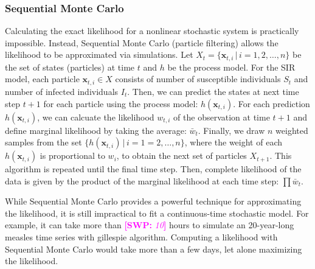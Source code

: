 \documentclass{article}
\newcommand{\comment}[3]{\textcolor{#1}{\textbf{[#2: }\textsl{#3}\textbf{]}}}
\newcommand{\swp}[1]{\comment{magenta}{SWP}{#1}}
\begin{document}
\subsubsection*{Sequential Monte Carlo}

Calculating the exact likelihood for a nonlinear stochastic system is practically impossible.
Instead, Sequential Monte Carlo (particle filtering) allows the likelihood to be approximated via simulations.
Let $X_t = \{\mathbf{x}_{t, i} \,|\, i= 1, 2, \dots, n\}$ be the set of states (particles) at time $t$ and $h$ be the process model.
For the SIR model, each particle $\mathbf{x}_{t, i} \in X$ consists of number of susceptible individuals $S_t$ and number of infected individuals $I_t$.
Then, we can predict the states at next time step $t+1$ for each particle using the process model: $h(\mathbf{x}_{t, i})$.
For each prediction $h(\mathbf{x}_{t, i})$, we can calcuate the likelihood $w_{t,i}$ of the observation at time $t+1$ and define marginal likelihood by taking the average: $\bar{w}_t$.
Finally, we draw $n$ weighted samples from the set $\{h(\mathbf{x}_{t, i}) \,|\, i = 1=2, \dots, n\}$, where the weight of each $h(\mathbf{x}_{t, i})$ is proportional to $w_i$, to obtain the next set of particles $X_{t+1}$.
This algorithm is repeated until the final time step.
Then, complete likelihood of the data is given by the product of the marginal likelihood at each time step: $\prod \bar{w}_{t}$.

While Sequential Monte Carlo provides a powerful technique for approximating the likelihood, it is still impractical to fit a continuous-time stochastic model. 
For example, it can take more than \swp{10} hours to simulate an 20-year-long measles time series with gillespie algorithm. 
Computing a likelihood with Sequential Monte Carlo would take more than a few days, let alone maximizing the likelihood.
\end{document}
